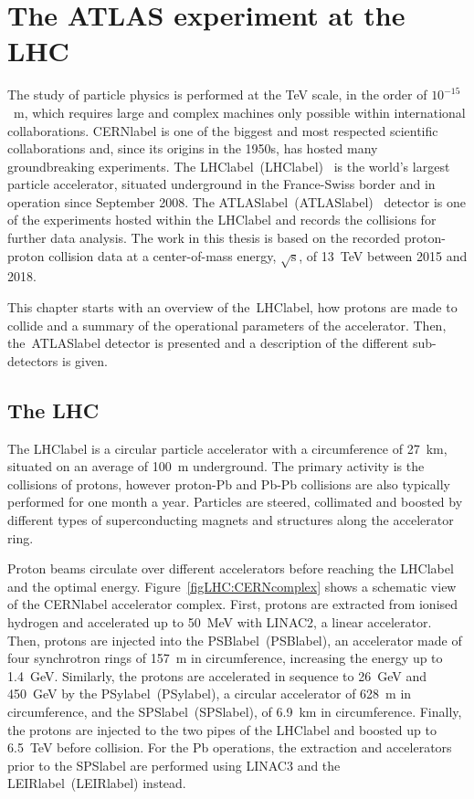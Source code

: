 \chapter{The ATLAS experiment at the LHC}
\label{chapter:ATLASLHC}

The study of particle physics is performed at the TeV scale, in the order of $10^{-15}$~m, which requires large and complex machines only possible within international collaborations. \acrshort{CERNlabel} is one of the biggest and most respected scientific collaborations and, since its origins in the 1950s, has hosted many groundbreaking experiments. The \acrlong{LHClabel}~(\acrshort{LHClabel})~\cite{LHCmachine} is the world's largest particle accelerator, situated underground in the France-Swiss border and in operation since September 2008. The \acrlong{ATLASlabel}~(\acrshort{ATLASlabel})~\cite{ATLASmachine} detector is one of the experiments hosted within the \acrshort{LHClabel} and records the collisions for further data analysis. The work in this thesis is based on the recorded proton-proton collision data at a center-of-mass energy, $\sqrt{\text{s}}$, of 13~TeV between 2015 and 2018.

This chapter starts with an overview of the~\acrshort{LHClabel}, how protons are made to collide and a summary of the operational parameters of the accelerator. Then, the~\acrshort{ATLASlabel} detector is presented and a description of the different sub-detectors is given.

\section{The LHC}

The \acrshort{LHClabel} is a circular particle accelerator with a circumference of 27~km, situated on an average of 100~m underground. The primary activity is the collisions of protons, however proton-Pb and Pb-Pb collisions are also typically performed for one month a year. Particles are steered, collimated and boosted by different types of superconducting magnets and structures along the accelerator ring.

Proton beams circulate over different accelerators before reaching the \acrshort{LHClabel} and the optimal energy. Figure~\ref{figLHC:CERNcomplex} shows a schematic view of the \acrshort{CERNlabel} accelerator complex. First, protons are extracted from ionised hydrogen and accelerated up to 50~MeV with LINAC2, a linear accelerator. Then, protons are injected into the \acrlong{PSBlabel}~(\acrshort{PSBlabel}), an accelerator made of four synchrotron rings of 157~m in circumference, increasing the energy up to 1.4~GeV. Similarly, the protons are accelerated in sequence to 26~GeV and 450~GeV by the \acrlong{PSylabel}~(\acrshort{PSylabel}), a circular accelerator of 628~m in circumference, and the \acrlong{SPSlabel}~(\acrshort{SPSlabel}), of 6.9~km in circumference. Finally, the protons are injected to the two pipes of the \acrshort{LHClabel} and boosted up to 6.5~TeV before collision. For the Pb operations, the extraction and accelerators prior to the \acrshort{SPSlabel} are performed using LINAC3 and the \acrlong{LEIRlabel}~(\acrshort{LEIRlabel}) instead.

